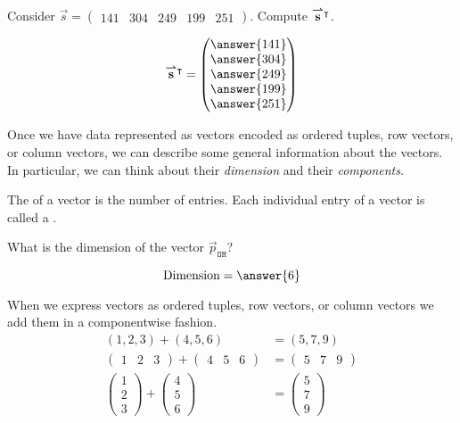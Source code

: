 \documentclass{ximera}
\begin{document}
\begin{question}
  Consider $\vec{s} = \begin{pmatrix}141 & 304 & 249 & 199 & 251 \end{pmatrix}$. Compute ${\overset{\boldsymbol{\rightharpoonup}}{\mathbf{s}}}\hspace{0in}^\intercal$.
  \begin{prompt}
  \[
  \vec{s}^\transpose  = \begin{pmatrix}\answer{141} \\ \answer{304} \\ \answer{249} \\ \answer{199} \\ \answer{251} \end{pmatrix}
  \]
  \end{prompt}
\end{question}

Once we have data represented as vectors encoded as ordered tuples,
row vectors, or column vectors, we can describe some general
information about the vectors. In particular, we can think about their
\textit{dimension} and their \textit{components}.

\begin{definition}
The  of a vector is the number of entries. Each
individual entry of a vector is called a .
\end{definition}

\begin{question}
  What is the dimension of the vector $\vec{p}_{\texttt{OH}}$?
  \begin{prompt}
  \[
  \text{Dimension} = \answer{6}
  \]
  \end{prompt}
\end{question}


When we express vectors as ordered tuples, row vectors, or column
vectors we add them in a componentwise fashion.
\begin{align*}
  (1,2,3) + (4,5,6) &= (5,7,9)\\
  \begin{pmatrix} 1 & 2 & 3   \end{pmatrix} + \begin{pmatrix} 4 & 5 & 6   \end{pmatrix} &= \begin{pmatrix} 5 & 7 & 9   \end{pmatrix}\\
  \begin{pmatrix} 1\\ 2\\ 3   \end{pmatrix} + \begin{pmatrix} 4\\ 5\\ 6   \end{pmatrix} &= \begin{pmatrix} 5\\ 7\\ 9   \end{pmatrix}
\end{align*}
\end{document}
